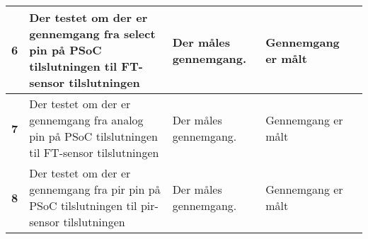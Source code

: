 \begin{center}
\begin{longtable}{|p{}|p{}|p{}|p{}|p{}|}
\textbf{6}	&Der testet om der er gennemgang fra select pin på PSoC tilslutningen til FT-sensor tilslutningen
			&Der måles gennemgang.
			& Gennemgang er målt
			& \\ \hline 
			
\textbf{7}	&Der testet om der er gennemgang fra analog pin på PSoC tilslutningen til FT-sensor tilslutningen
			&Der måles gennemgang.
			& Gennemgang er målt
			& \\ \hline 
			
\textbf{8}	&Der testet om der er gennemgang fra pir pin på PSoC tilslutningen til pir-sensor tilslutningen
			&Der måles gennemgang.
			& Gennemgang er målt
			& \\ \hline 
			

			
		
			
			
\end{longtable}
	\label{lab:modultest_tilslutningsprint} 
\end{center}